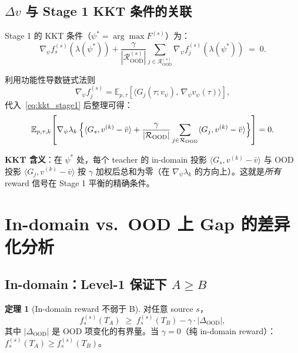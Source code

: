 \documentclass[11pt,a4paper]{article}
\newcommand{\E}{\mathbb{E}}
\newcommand{\OOD}{\mathrm{OOD}}
\theoremstyle{definition}
\newtheorem{theorem}{定理}
\begin{document}
\subsection{$\Delta v$ 与 Stage 1 KKT 条件的关联}

Stage 1 的 KKT 条件（$\psi^* = \arg\max F^{(s)}$）为：
\begin{equation}
\nabla_\psi f_s^{(s)}(\lambda(\psi^*)) + \frac{\gamma}{|\mathcal{R}_{\OOD}^{(s)}|}\sum_{j \in \mathcal{R}_{\OOD}^{(s)}}\nabla_\psi f_j^{(s)}(\lambda(\psi^*)) \;=\; 0.
\label{eq:kkt_stage1}
\end{equation}

利用功能性导数链式法则
\begin{equation}
\nabla_\psi f_j^{(s)} = \E_{p, \tau}\!\left[\langle G_j(\tau; v_\psi),\,\nabla_\psi v_\psi(\tau)\rangle\right],
\end{equation}
代入~\eqref{eq:kkt_stage1} 后整理可得：
\begin{equation}
\E_{p, \tau, k}\!\left[\nabla_\psi \lambda_k\,\Bigl\{\langle G_s, v^{(k)} - \bar{v}\rangle + \frac{\gamma}{|\mathcal{R}_{\OOD}|}\sum_{j \in \mathcal{R}_{\OOD}}\langle G_j, v^{(k)} - \bar{v}\rangle\Bigr\}\right] = 0.
\label{eq:kkt_expanded}
\end{equation}

\textbf{KKT 含义}：在 $\psi^*$ 处，每个 teacher 的 in-domain 投影
$\langle G_s, v^{(k)} - \bar{v}\rangle$ 与 OOD 投影
$\langle G_j, v^{(k)} - \bar{v}\rangle$ 按 $\gamma$ 加权后总和为零（在
$\nabla_\psi \lambda_k$ 的方向上）。这就是\emph{所有} reward 信号在 Stage 1
平衡的精确条件。

\section{In-domain vs.\ OOD 上 Gap 的差异化分析}
\label{sec:in_vs_ood}

\subsection{In-domain：Level-1 保证下 $A \geq B$}

\begin{theorem}[In-domain reward 不弱于 B]
\label{thm:in_domain_geq}
对任意 source $s$，
\begin{equation}
f_s^{(s)}(T_A) \;\geq\; f_s^{(s)}(T_B) - \gamma \cdot |\Delta_{\OOD}|,
\end{equation}
其中 $|\Delta_{\OOD}|$ 是 OOD 项变化的有界量。当 $\gamma = 0$（纯
in-domain reward）：$f_s^{(s)}(T_A) \geq f_s^{(s)}(T_B)$。
\end{theorem}
\end{document}
